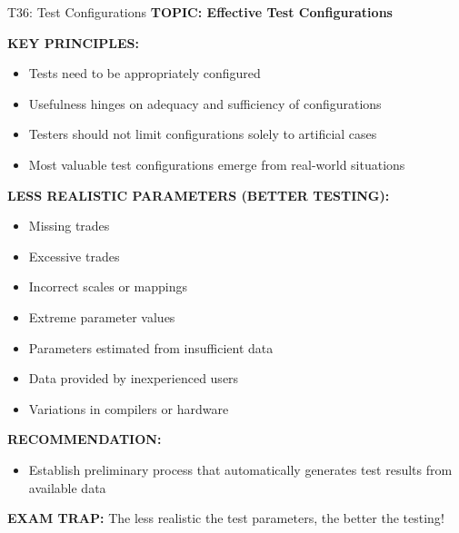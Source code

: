 \documentclass[8pt]{beamer}
\begin{document}
	\begin{frame}{T36: Test Configurations}
		\fontsize{6.5}{7.5}\selectfont
		\textbf{TOPIC: Effective Test Configurations}
		
		\vspace{0.1cm}
		\textbf{KEY PRINCIPLES:}
		\begin{itemize}
			\item Tests need to be appropriately configured
			\item Usefulness hinges on adequacy and sufficiency of configurations
			\item Testers should not limit configurations solely to artificial cases
			\item Most valuable test configurations emerge from real-world situations
		\end{itemize}
		
		\vspace{0.1cm}
		\textbf{LESS REALISTIC PARAMETERS (BETTER TESTING):}
		\begin{itemize}
			\item Missing trades
			\item Excessive trades
			\item Incorrect scales or mappings
			\item Extreme parameter values
			\item Parameters estimated from insufficient data
			\item Data provided by inexperienced users
			\item Variations in compilers or hardware
		\end{itemize}
		
		\vspace{0.1cm}
		\textbf{RECOMMENDATION:}
		\begin{itemize}
			\item Establish preliminary process that automatically generates test results from available data
		\end{itemize}
		
		\textcolor{myred}{\textbf{EXAM TRAP:}} The less realistic the test parameters, \textcolor{myblue}{the better the testing}!
	\end{frame}
	
\end{document}
